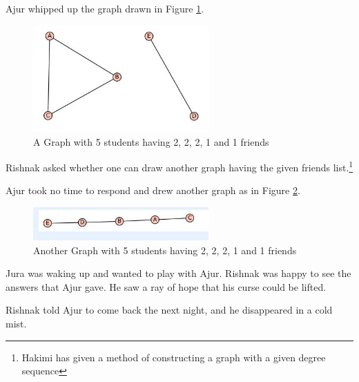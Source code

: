 Ajur whipped up the graph drawn in Figure \ref{dg3}. 

\begin{figure}
\begin{center}
\includegraphics[width=0.6\textwidth]{graphstory1-2.JPG}
\caption{A Graph with 5 students having 2, 2, 2, 1 and 1 friends}\label{dg3}
\end{center}
\end{figure}

Rishnak asked whether one can draw another graph having the given friends list.\footnote{Hakimi has given a method of constructing a graph with a given degree sequence}

Ajur took no time to respond and drew another graph as in Figure \ref{dg4}.

\begin{figure}
\begin{center}
\includegraphics[width=0.6\textwidth]{graphstory1-3.JPG}
\caption{Another Graph with 5 students having 2, 2, 2, 1 and 1 friends}\label{dg4}
\end{center}
\end{figure}

Jura was waking up and wanted to play with Ajur. Rishnak was happy to see the answers that Ajur gave. He saw a ray of hope that his curse could be lifted. 

Rishnak told Ajur to come back the next night, and he disappeared in a cold mist.